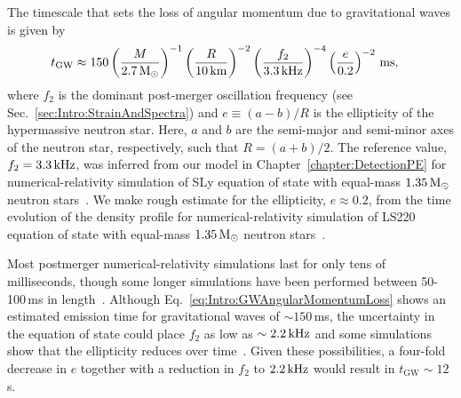 \documentclass[../Thesis.tex]{subfiles}
\begin{document}
    The timescale that sets the loss of angular momentum due to gravitational waves is given by~\cite{Paschalidis2012}
    \begin{align}
        t_{\mathrm{GW}} & \approx 150 \left(\frac{M}{2.7\,\mathrm{M}_{\odot}}\right)^{-1}\left(\frac{R}{10\,\mathrm{km}}\right)^{-2}\left(\frac{f_2}{3.3\,\mathrm{kHz}} \right)^{-4}\left(\frac{e}{0.2} \right)^{-2}\,\mathrm{ms}, \label{eq:Intro:GWAngularMomentumLoss}        
    \end{align}
    where $f_2$ is the dominant post-merger oscillation frequency (see Sec.~\ref{sec:Intro:StrainAndSpectra}) and $e\equiv(a-b)/R$ is the ellipticity of the hypermassive neutron star. 
    Here, $a$ and $b$ are the semi-major and semi-minor axes of the neutron star, respectively, such that $R=(a+b)/2$.
    The reference value, $f_2=3.3\,\mathrm{kHz}$, was inferred from our model in Chapter~\ref{chapter:DetectionPE} for numerical-relativity simulation of SLy equation of state with equal-mass $1.35\,\mathrm{M}_{\odot}$ neutron stars~\cite{Radice2016}.
    We make rough estimate for the ellipticity,  $e\approx0.2$, from the time evolution of the density profile for numerical-relativity simulation of LS220 equation of state with equal-mass $1.35\,\mathrm{M}_{\odot}$ neutron stars~\cite{Radice2017}.\par
    
    Most postmerger numerical-relativity simulations last for only tens of milliseconds, though some longer simulations have been performed between 50-100\,ms in length~\cite{Rezzolla2010,Ciolfi2017,Ciolfi2019,DePietri2020}.
    Although Eq.~\ref{eq:Intro:GWAngularMomentumLoss} shows an estimated emission time for gravitational waves of $\sim 150\,$ms, the uncertainty in the equation of state could place $f_2$ as low as $\sim 2.2\,\mathrm{kHz}$ and some simulations show that the ellipticity reduces over time~\cite{Takami2015,Shibata2017a}.
    Given these possibilities, a four-fold decrease in $e$ together with a reduction in $f_2$ to $2.2\,\mathrm{kHz}$ would result in $t_{\mathrm{GW}} \sim 12\,$s.
    
\end{document}

